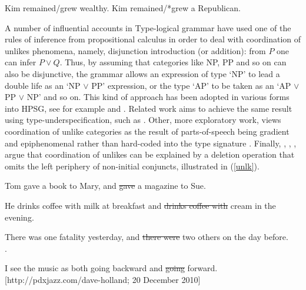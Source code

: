 \documentclass[output=paper
                ,modfonts
                ,nonflat
	        ,collection
	        ,collectionchapter
	        ,collectiontoclongg
 	        ,biblatex
                ,babelshorthands
                ,newtxmath
                ,draftmode
                ,colorlinks, citecolor=brown
]{./langsci/langscibook}
\begin{document}
\begin{exe}
\ex
\begin{xlista}
\ex  Kim remained/grew wealthy.
\ex  Kim remained/*grew a Republican.
\end{xlista}\label{republican}
\end{exe}



\begin{exe}
\ex
\begin{xlista}
\end{xlista}\label{show2}
\end{exe}



A number of influential accounts in Type-logical grammar
\citep{morrill90,morrill94,bayer} have used one of the rules of
inference from propositional calculus in order to deal with
coordination of unlikes phenomena, namely, disjunction introduction
(or addition): from $P$ one can infer $P \vee Q$. 
Thus, by assuming that categories like NP, PP
and so on can also be disjunctive, the grammar allows an expression
of type `NP' to lead a double life as an `NP $\vee$ PP' expression,
or the type `AP' to be taken as an `AP $\vee$ PP $\vee$ NP' and so
on. This kind of approach has been adopted in various forms into HPSG, see for example \citet{Daniels02} and  \citet{Yatabe:04}.
Related work aims to achieve the same result using type-underspecification, such as 
 \citet{sag}. Other, more exploratory work, views coordination of unlike categories as the result of   parts-of-speech being gradient and  epiphenomenal rather than hard-coded into the type signature  \citep{bookivan}. 
 Finally,  
 \citet{berthold0}, \citet{yatabe},  \citet{Beavers},
 \citet{chaves06}  argue that
coordination of unlikes can be explained by
a deletion operation that omits the left periphery of
non-initial conjuncts, illustrated in   (\ref{unlk}).


\begin{exe}
\ex
\begin{xlista}
\ex Tom gave a book to Mary, and \sout{gave} a magazine to Sue. 

\ex He drinks coffee with milk at breakfast and \sout{drinks coffee with} cream in the evening.\\ \citep{hudson84}

\ex There was one fatality yesterday, and \sout{there were} two others on the day
before.\\
\citep[339]{chavesthesis}.

\ex I see the music as both going backward and \sout{going} forward.\\
{\small [http://pdxjazz.com/dave-holland; 20 December 2010]}
\end{xlista}\label{unlk}
\end{exe}
\end{document}

